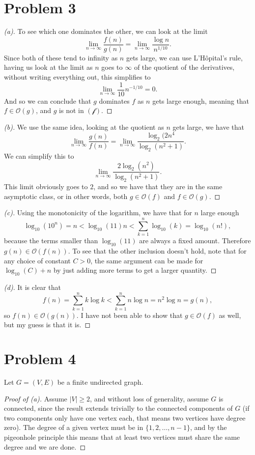 \documentclass[11pt,a4paper]{article}
\begin{document}
\section*{Problem 3}
\begin{proof}[(a)]
To see which one dominates the other, we can look at the limit 
\[
\lim_{n \to \infty} \frac{f(n)}{g(n)} = \lim_{n \to \infty} \frac{\log n}{ n^{1/10}}.
\] Since both of these tend to infinity as $n$ gets large, we can use L'Hôpital's rule, having us look at the limit as $n$ goes to $\infty$ of the quotient of the derivatives, without writing everything out, this simplifies to 
\[
\lim_{n \to \infty} \frac{1}{10}n^{- 1 /10} = 0.
\] And so we can conclude that $g$ dominates $f$ as  $n$ gets large enough, meaning that $f \in \mathcal{O}(g)$, and $g$ is not in $\mathcal{(f)}$.
\end{proof}
\begin{proof}[(b)]
We use the same idea, looking at the quotient as $n$ gets large, we have that \[
\lim_{n \to \infty} \frac{g(n)}{ f(n)} =  \lim_{n \to \infty} \frac{\log_{2}(2n^4}{\log_{2}(n^{2} + 1)} .
\] We can simplify this to \[
\lim_{n \to \infty} \frac{2\log_{2}(n^2)}{\log_{2}(n^2 + 1)}.
\] This limit obviously goes to $2$, and so we have that they are in the same asymptotic class, or in other words, both $g \in \mathcal{O}(f)$ and $f \in  \mathcal{O}(g)$.
\end{proof}
\begin{proof}[(c)]
Using the monotonicity of the logarithm, we have that for $n$ large enough 
\[
\log_{10} (10^{n}) = n < \log_{10}(11) n < \sum_{k=1}^{n} \log_{10} ( k) = \log_{10}(n!),
\] because the terms smaller than $\log_{10}(11)$ are always a fixed amount. Therefore $g(n) \in  \mathcal{O}(f(n)) $. To see that the other inclusion doesn't hold, note that for any choice of constant $C>0$, the same argument can be made for $\log_{10}(C) + n$ by just adding more terms to get a larger quantity.
\end{proof}
\begin{proof}[(d)]
 It is clear that \[
 f(n) = \sum_{k=1}^{n} k \log k < \sum_{k=1}^{n} n \log n  =  n^2\log n =g(n),
 \] so $f(n ) \in \mathcal{O}(g(n))$. I have not been able to show that $g \in \mathcal{O}(f)$ as well, but my guess is that it is. 
\end{proof}

\section*{Problem 4}
Let $G = (V,E)$ be a finite undirected graph.
\begin{proof}[Proof of (a)]
 Assume $\left|V\right| \geq 2$, and without loss of generality, assume $G$ is
connected, since the result extends trivially to the connected components of
$G$ (if two components only have one vertex each, that means two vertices have
degree zero).  The degree of a given vertex must be in $\{1,2,\ldots,n-1\}$,
and by the pigeonhole principle this means that at least two vertices must
share the same degree and we are done.
\end{proof}
\end{document}
